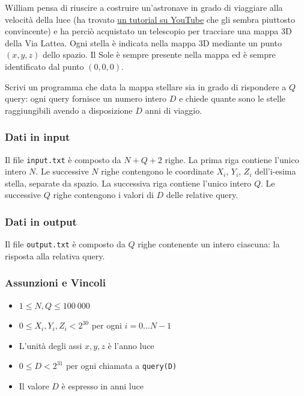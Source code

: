 \bigskip
William pensa di riuscire a costruire un’astronave in grado di viaggiare alla velocità della luce (ha trovato \href{https://www.youtube.com/watch?v=dQw4w9WgXcQ}{un tutorial su YouTube} che gli sembra piuttosto convincente) e ha perciò acquistato un telescopio per
tracciare una mappa 3D della Via Lattea. Ogni stella è indicata nella mappa 3D mediante un punto
$(x, y,z)$ dello spazio. Il Sole è sempre presente nella mappa ed è sempre identificato dal punto $(0,0,0)$.

\medskip
Scrivi un programma che data la mappa stellare sia in grado di rispondere a $Q$ query: ogni query fornisce un numero intero $D$ e chiede quante sono le stelle raggiungibili avendo a disposizione $D$ anni di viaggio.



\subsubsection*{Dati in input}  

Il file \verb|input.txt| è composto da $N+Q+2$ righe. La prima riga contiene l’unico intero $N$. Le successive $N$ righe contengono le coordinate $X_i$, $Y_i$, $Z_i$ dell’i-esima stella, separate da spazio. La successiva riga
contiene l’unico intero $Q$. Le successive $Q$ righe contengono i valori di $D$ delle relative query.

\subsubsection*{Dati in output}  

Il file \verb|output.txt| è composto da $Q$ righe contenente un intero ciascuna: la risposta alla relativa query.

\subsubsection*{Assunzioni e Vincoli}  


\begin{itemize}
	
	\item $1 \le N, Q \le 100\ 000$
	
	\item $0 \le X_i, Y_i, Z_i < 2^{30}$ per ogni $i = 0 \dots N-1$
	
	\item L’unità degli assi $x, y, z$ è l’anno luce
	
	\item $0 \le D < 2^{31}$ per ogni chiamata a \texttt{query(D)}
	
	\item Il valore $D$ è espresso in anni luce
	
\end{itemize}

